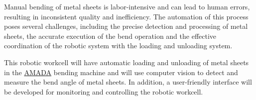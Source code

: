 Manual bending of metal sheets is labor-intensive and can 
lead to human errors, resulting in inconsistent quality
and inefficiency. The automation of this process poses
several challenges, including the precise detection and
processing of metal sheets, the accurate execution of
the bend operation and the effective coordination of
the robotic system with the loading and unloading system.

This robotic workcell will have automatic loading and unloading
of metal sheets in the \hyperref[acro:AMADA]{AMADA} bending machine and will use
computer vision to detect
and measure the bend angle of metal sheets.
In addition, a user-friendly interface will be developed for
monitoring and controlling the robotic workcell.